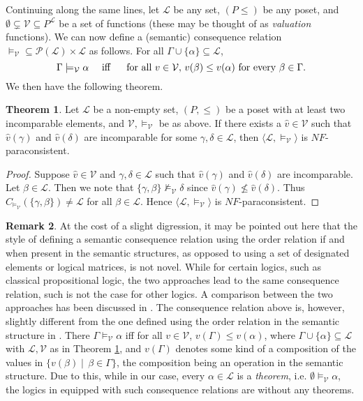 \documentclass[submission]{eptcs}
\newcommand{\lang}{\mathcal{L}}
\newcommand{\pow}{\mathcal{P}}
\theoremstyle{definition}
\newtheorem{thm}{Theorem}[section]
\newtheorem{rem}[thm]{Remark}
\begin{document}
Continuing along the same lines, let $\lang$ be any set, $(P\le)$ be any poset, and $\emptyset\subsetneq\mathcal{V}\subseteq P^\lang$ be a set of functions (these may be thought of as \emph{valuation} functions). We can now define a (semantic) consequence relation $\models_\mathcal{V}\subseteq\pow(\lang)\times\lang$ as follows. For all $\Gamma\cup\{\alpha\}\subseteq\lang$,
\[
\Gamma\models_\mathcal{V}\alpha\quad \hbox{ iff }\quad\hbox{ for all }v\in\mathcal{V},\, v(\beta)\le v(\alpha)\hbox{ for every }\beta\in\Gamma.
\]
We then have the following theorem.

\begin{thm}\label{thm:posetWincom}
Let $\lang$ be a non-empty set, $(P,\le)$ be a poset with at least two incomparable elements, and $\mathcal{V},\models_\mathcal{V}$ be as above. If there exists a $\widehat{v}\in\mathcal{V}$ such that $\widehat{v}(\gamma)$ and $\widehat{v}(\delta)$ are incomparable for some $\gamma,\delta\in\lang$, then $\langle\lang,\models_\mathcal{V}\rangle$ is $NF$-paraconsistent.
\end{thm}

\begin{proof}
Suppose $\widehat{v}\in\mathcal{V}$ and $\gamma,\delta\in\lang$ such that $\widehat{v}(\gamma)$ and $\widehat{v}(\delta)$ are incomparable. Let $\beta\in\lang$. Then we note that $\{\gamma,\beta\}\not\models_\mathcal{V}\delta$ since $\widehat{v}(\gamma)\not\le\widehat{v}(\delta)$. Thus $C_{\models_\mathcal{V}}(\{\gamma,\beta\})\neq\lang$ for all $\beta\in\lang$. Hence $\langle\lang,\models_\mathcal{V}\rangle$ is $NF$-paraconsistent.
\end{proof}

\begin{rem}
At the cost of a slight digression, it may be pointed out here that the style of defining a semantic consequence relation using the order relation if and when present in the semantic structures, as opposed to using a set of designated elements or logical matrices, is not novel. While for certain logics, such as classical propositional logic, the two approaches lead to the same consequence relation, such is not the case for other logics. A comparison between the two approaches has been discussed in \cite{SenChakraborty2008}. The consequence relation above is, however, slightly different from the one defined using the order relation in the semantic structure in \cite{SenChakraborty2008}. There $\Gamma\models_\mathcal{V}\alpha$ iff for all $v\in\mathcal{V}$, $v(\Gamma)\le v(\alpha)$, where $\Gamma\cup\{\alpha\}\subseteq\lang$ with $\lang,\mathcal{V}$ as in Theorem \ref{thm:posetWincom}, and $v(\Gamma)$ denotes some kind of a composition of the values in $\{v(\beta)\mid\,\beta\in\Gamma\}$, the composition being an operation in the semantic structure. Due to this, while in our case, every $\alpha\in\lang$ is a \emph{theorem}, i.e. $\emptyset\models_\mathcal{V}\alpha$, the logics in \cite{SenChakraborty2008} equipped with such consequence relations are without any theorems.
\end{rem}
\end{document}
